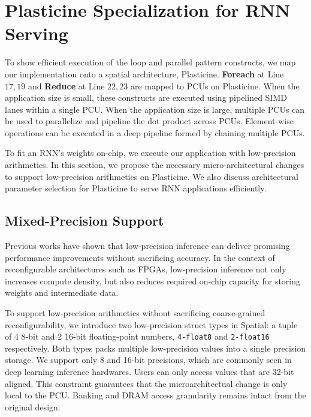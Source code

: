 \section{Plasticine Specialization for RNN Serving}
\label{sec:arch}
To show efficient execution of the loop and parallel pattern constructs,
  we map our implementation onto a spatial architecture, Plasticine.
\textbf{Foreach} at Line $17, 19$ and \textbf{Reduce} at Line $22, 23$
  are mapped to PCUs on Plasticine.
When the application size is small,
  these constructs are executed using pipelined SIMD lanes within a single PCU.
When the application size is large,
  multiple PCUs can be used to parallelize and pipeline the dot
  product across PCUs. Element-wise operations can be executed in a deep pipeline
  formed by chaining multiple PCUs.

To fit an RNN's weights on-chip,
  we execute our application with low-precision arithmetics.
In this section,
  we propose the necessary micro-architectural changes to
  support low-precision arithmetics on Plasticine.
We also discuss architectural parameter selection for Plasticine
  to serve RNN applications efficiently.

\subsection{Mixed-Precision Support}
\label{sec:arch:varprec}
Previous works \cite{fowers2018configurable, jouppi2017datacenter}
  have shown that low-precision inference can deliver promising performance
  improvements without sacrificing accuracy.
In the context of reconfigurable architectures such as FPGAs,
  low-precision inference not only increases compute density,
  but also reduces required on-chip capacity for
  storing weights and intermediate data.

To support low-precision arithmetics without sacrificing coarse-grained reconfigurability,
we introduce two low-precision struct types in Spatial: a tuple of 4 8-bit and 2 16-bit floating-point 
numbers, \texttt{4-float8} and \texttt{2-float16} respectively.
Both types packs multiple low-precision values into a single precision storage.
We support only 8 and 16-bit precisions, which are commonly seen in deep learning inference hardwares.
Users can only access values that are 32-bit aligned.
This constraint guarantees that the microarchitectual change is only local to the PCU.
Banking and DRAM access granularity remains intact from the original design.

